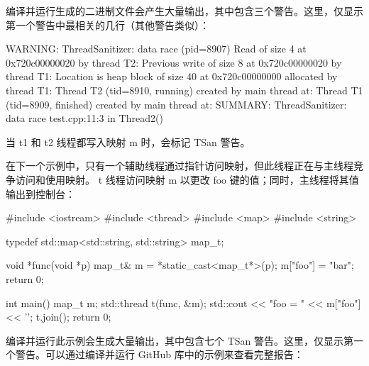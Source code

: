 编译并运行生成的二进制文件会产生大量输出，其中包含三个警告。这里，仅显示第一个警告中最相关的几行（其他警告类似）：

\begin{shell}
WARNING: ThreadSanitizer: data race (pid=8907)
    Read of size 4 at 0x720c00000020 by thread T2:
    Previous write of size 8 at 0x720c00000020 by thread T1:
    Location is heap block of size 40 at 0x720c00000000 allocated by
thread T1:
    Thread T2 (tid=8910, running) created by main thread at:
    Thread T1 (tid=8909, finished) created by main thread at:
SUMMARY: ThreadSanitizer: data race test.cpp:11:3 in Thread2()
\end{shell}

当 t1 和 t2 线程都写入映射 m 时，会标记 TSan 警告。

在下一个示例中，只有一个辅助线程通过指针访问映射，但此线程正在与主线程竞争访问和使用映射。 t 线程访问映射 m 以更改 foo 键的值；同时，主线程将其值输出到控制台：

\begin{cpp}
#include <iostream>
#include <thread>
#include <map>
#include <string>

typedef std::map<std::string, std::string> map_t;

void *func(void *p) {
    map_t& m = *static_cast<map_t*>(p);
    m["foo"] = "bar";
    return 0;
}

int main() {
    map_t m;
    std::thread t(func, &m);
    std::cout << "foo = " << m["foo"] << '\n';
    t.join();
    return 0;
}
\end{cpp}

编译并运行此示例会生成大量输出，其中包含七个 TSan 警告。这里，仅显示第一个警告。可以通过编译并运行 GitHub 库中的示例来查看完整报告：



